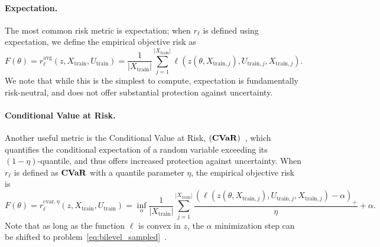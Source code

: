 \paragraph{Expectation.} The most common risk metric is expectation; when $r_\ell$ is defined using expectation, we define the empirical objective risk as
\begin{equation*}
F(\theta) = r^{\text{avg}}_\ell(z,X_{\text{train}},U_{\text{train}})= \frac{1}{|X_{\text{train}}|}\sum_{j=1}^{|X_{\text{train}}|}\ell(z(\theta,X_{\text{train},j}),U_{\text{train},j}, X_{\text{train},j}).
\end{equation*}
We note that while this is the simplest to compute, expectation is fundamentally risk-neutral, and does not offer substantial protection against uncertainty. 

\paragraph{Conditional Value at Risk.}
Another useful metric is the Conditional Value at Risk, $(\mathop{\bf CVaR})$~\cite{cvaropt,cvar}, which quantifies the conditional expectation of a random variable exceeding its $(1-\eta)$-quantile, and thus offers increased protection against uncertainty. When $r_\ell$ is defined as $\mathop{\bf CVaR}$ with a quantile parameter $\eta$, the empirical objective risk is
\begin{equation*}
F(\theta) = r^{\text{cvar},\eta}_\ell(z,X_{\text{train}},U_{\text{train}}) = \inf_{\alpha}\frac{1}{|X_{\text{train}}|}\sum_{j=1}^{|X_{\text{train}}|}\frac{(\ell(z(\theta,X_{\text{train},j}),U_{\text{train},j}, X_{\text{train},j})-\alpha)_+}{\eta} + \alpha.
\end{equation*}
Note that as long as the function $\ell$ is convex in $z$, the $\alpha$ minimization step can be shifted to problem~\eqref{eq:bilevel_sampled}~\cite{cvar_ref}.


